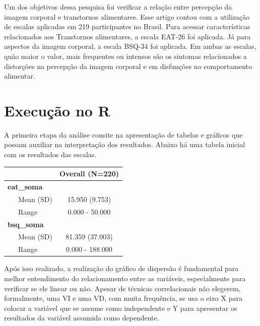 \documentclass[
]{book}
\newenvironment{Shaded}{\begin{snugshade}}{\end{snugshade}}
\newcommand{\DataTypeTok}[1]{\textcolor[rgb]{0.13,0.29,0.53}{#1}}
\newcommand{\KeywordTok}[1]{\textcolor[rgb]{0.13,0.29,0.53}{\textbf{#1}}}
\newcommand{\NormalTok}[1]{#1}
\newcommand{\OperatorTok}[1]{\textcolor[rgb]{0.81,0.36,0.00}{\textbf{#1}}}
\newcommand{\OtherTok}[1]{\textcolor[rgb]{0.56,0.35,0.01}{#1}}
\newcommand{\StringTok}[1]{\textcolor[rgb]{0.31,0.60,0.02}{#1}}
\begin{document}
Um dos objetivos dessa pesquisa foi verificar a relação entre percepção da imagem corporal e transtornos alimentares. Esse artigo contou com a utilização de escalas aplicadas em 219 participantes no Brasil. Para acessar características relacionados aos Transtornos alimentares, a escala EAT-26 foi aplicada. Já para aspectos da imagem corporal, a escala BSQ-34 foi aplicada. Em ambas as escalas, quão maior o valor, mais frequentes ou intensos são os sintomas relacionados a distorções na percepção da imagem corporal e em disfunções no comportamento alimentar.

\hypertarget{execuuxe7uxe3o-no-r-12}{%
\section{Execução no R}\label{execuuxe7uxe3o-no-r-12}}

A primeira etapa da análise consite na apresentação de tabelas e gráficos que possam auxiliar na interpretação dos resultados. Abaixo há uma tabela inicial com os resultados das escalas.

\begin{Shaded}
\end{Shaded}

\begin{longtable}[]{@{}lc@{}}
\toprule
& Overall (N=220)\tabularnewline
\midrule
\endhead
\textbf{eat\_soma} &\tabularnewline
~~~Mean (SD) & 15.950 (9.753)\tabularnewline
~~~Range & 0.000 - 50.000\tabularnewline
\textbf{bsq\_soma} &\tabularnewline
~~~Mean (SD) & 81.359 (37.003)\tabularnewline
~~~Range & 0.000 - 188.000\tabularnewline
\bottomrule
\end{longtable}

Após isso realizado, a realização do gráfico de dispersão é fundamental para melhor entendimento do relacionamento entre as variáveis, especialmente para verificar se ele linear ou não. Apesar de técnicas correlacionais não elegerem, formalmente, uma VI e uma VD, com muita frequência, se usa o eixo X para colocar a variável que se assume como independente e Y para apresentar os resultados da variável assumida como dependente.
\end{document}
